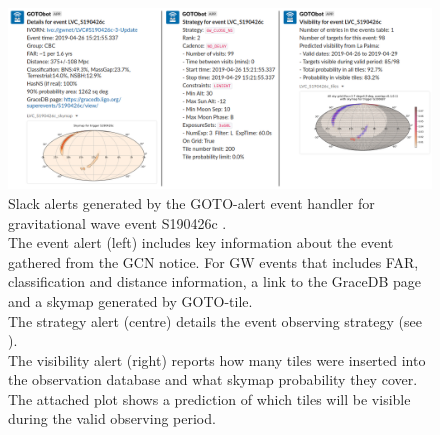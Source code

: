 \begin{colsection}
\begin{colsection}
\begin{figure}
    \begin{center}
        \includegraphics[width=\linewidth]{images/slack_alert_side2.png}
    \end{center}
    \caption[Slack alerts created by GOTO-alert for a GW event]{
        Slack alerts generated by the GOTO-alert event handler for gravitational wave event S190426c .\\
        The event alert (left) includes key information about the event gathered from the GCN notice. For GW events that includes FAR, classification and distance information, a link to the GraceDB page and a skymap generated by GOTO-tile.\\
        The strategy alert (centre) details the event observing strategy (see ).\\
        The visibility alert (right) reports how many tiles were inserted into the observation database and what skymap probability they cover. The attached plot shows a prediction of which tiles will be visible during the valid observing period.
    }\label{fig:gotoalert_slack}
\end{figure}

\end{colsection}


\end{colsection}


\newpage
